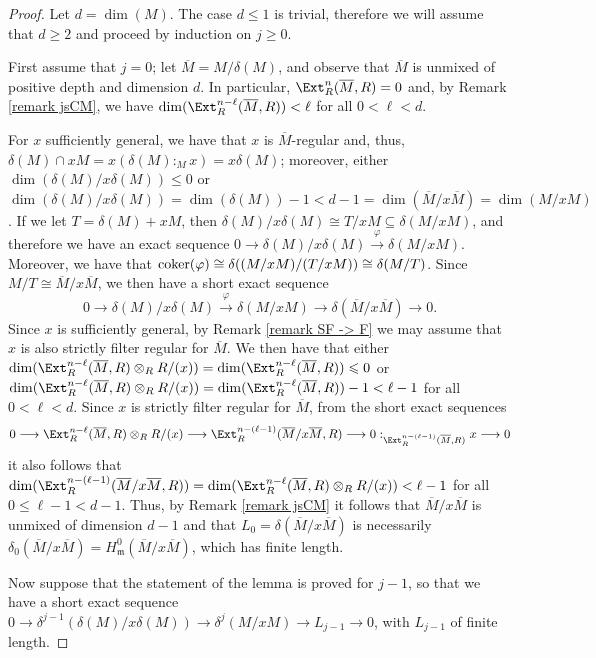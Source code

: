 \documentclass[12pt]{amsart}
\newcommand{\eee}[1]{{\color{blue} \sf $\clubsuit\clubsuit\clubsuit$ [#1]}}
\theoremstyle{definition}
\theoremstyle{definition}
\newcommand{\m}{\mathfrak{m}}
\newcommand{\ov}[1]{\overline{{#1}}}
\renewcommand{\leq}{\leqslant}
\renewcommand{\geq}{\geqslant}
\let\ov\overline
\let\lra\longrightarrow
\begin{document}
\begin{proof}
    Let $d=\dim(M)$. The case $d \leq 1$ is trivial, therefore we will assume that $d\geq 2$ and proceed by induction on $j \geq 0$.

    \smallskip
    \noindent
    First assume that $j=0$; let $\ov{M} = M/\delta(M)$, and observe that $\ov{M}$ is unmixed of positive depth and dimension $d$. In particular, $\Ext^n_R(\ov{M},R)=0$ and, by Remark \ref{remark jsCM}, we have $\dim(\Ext^{n-\ell}_R(\ov{M},R)) < \ell$ for all $0 < \ell <d $.

    For $x$ sufficiently general, we have that $x$ is $\ov{M}$-regular and, thus, $\delta(M) \cap xM = x(\delta(M):_M x) = x \delta(M)$; moreover,  either $\dim(\delta(M)/x\delta(M)) \leq 0$ or $\dim(\delta(M)/x \delta(M)) = \dim(\delta(M))-1<d-1 = \dim(\ov{M}/x\ov{M})=\dim(M/xM)$. If we let $T=\delta(M)+xM$, then $\delta(M)/x\delta(M) \cong T/xM  \subseteq \delta(M/xM)$, and therefore we have an exact sequence $0 \to \delta(M)/x\delta(M) \stackrel{\varphi}{\to} \delta(M/xM)$. Moreover, we have that 
${\rm coker}(\varphi)\cong \delta((M/xM)/(T/xM)) \cong \delta(M/T)$. Since $M/T\cong \ov{M}/x\ov{M}$, we then have a short exact sequence $$0 \lra \delta(M)/x\delta(M) \stackrel{\varphi}{\lra} \delta(M/xM) \lra \delta(\ov{M}/x\ov{M}) \lra 0.$$
Since $x$ is sufficiently general, by Remark \ref{remark SF -> F} we may assume that $x$ is also strictly filter regular for $\ov{M}$. We then have that either $\dim(\Ext^{n-\ell}_R(\ov{M},R) \otimes_R R/(x)) = \dim(\Ext^{n-\ell}_R(\ov M,R)) \leq 0$ or $\dim(\Ext^{n-\ell}_R(\ov M,R) \otimes_R R/(x)) = \dim(\Ext^{n-\ell}_R(\ov M,R))-1<\ell-1$ for all $0<\ell<d$. Since $x$ is strictly filter regular for $\ov{M}$, from the short exact sequences 
\[
0 \lra \Ext^{n-\ell}_R(\ov M,R) \otimes_R R/(x) \lra \Ext^{n-(\ell-1)}_R(\ov M/x\ov M,R) \lra 0:_{\Ext^{n-(\ell-1)}_R(\ov M,R)} x \lra 0
\]
it also follows that $\dim(\Ext^{n-(\ell-1)}_R(\ov M/x\ov M,R)) = \dim( \Ext^{n-\ell}_R(\ov M,R) \otimes_R R/(x))<\ell-1$ for all $0\leq \ell-1<d-1$. Thus, by Remark \ref{remark jsCM} it follows that $\ov{M}/x\ov{M}$ is unmixed of dimension $d-1$ and  that $L_0=\delta(\ov M/x\ov M)$ is necessarily $\delta_0(\ov M/x\ov M)=H^0_\m(\ov M/x\ov M)$, which  has finite length. %

\medskip
Now suppose that the statement of the lemma is proved for $j-1$, so that we have a short exact sequence $0 \to \delta^{j-1}(\delta(M)/x\delta(M)) \to \delta^j(M/xM) \to L_{j-1} \to 0$,  with $L_{j-1}$ of finite length. %


\end{proof}
\end{document}

